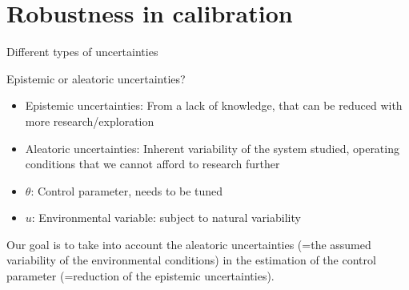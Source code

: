 \documentclass[10pt,aspectratio=169,usepdftitle=false]{beamer}
\newcommand{\kk}{\theta}
\newcommand{\uu}{u}
\begin{document}
\section{Robustness in calibration}
\begin{frame}{Different types of uncertainties}
  \begin{block}{Epistemic or aleatoric
      uncertainties?~\citep{walker_defining_2003}}
    \begin{itemize}
    \item Epistemic uncertainties: From a lack of knowledge, that can
      be reduced with more research/exploration
    \item Aleatoric uncertainties: Inherent variability of the system
      studied, operating conditions that we cannot afford to research further
    \end{itemize}
  \end{block}

  \begin{itemize}
  \item $\kk$: Control parameter, needs to be tuned
  \item $\uu$: Environmental variable: subject to natural variability
  \end{itemize}
  
  Our goal is to take into account the aleatoric uncertainties (=the
  assumed variability of the environmental conditions) in the
  estimation of the control parameter (=reduction of the epistemic uncertainties).
\end{frame}
\end{document}
